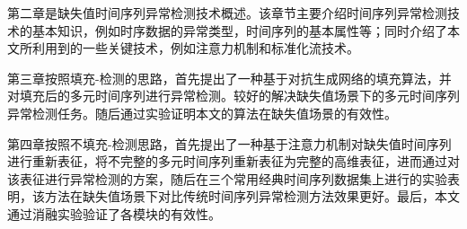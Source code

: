 第二章是缺失值时间序列异常检测技术概述。该章节主要介绍时间序列异常检测技术的基本知识，例如时序数据的异常类型，时间序列的基本属性等；同时介绍了本文所利用到的一些关键技术，例如注意力机制和标准化流技术。

第三章按照填充-检测的思路，首先提出了一种基于对抗生成网络的填充算法，并对填充后的多元时间序列进行异常检测。较好的解决缺失值场景下的多元时间序列异常检测任务。随后通过实验证明本文的算法在缺失值场景的有效性。

第四章按照不填充-检测思路，首先提出了一种基于注意力机制对缺失值时间序列进行重新表征，将不完整的多元时间序列重新表征为完整的高维表征，进而通过对该表征进行异常检测的方案，随后在三个常用经典时间序列数据集上进行的实验表明，该方法在缺失值场景下对比传统时间序列异常检测方法效果更好。最后，本文通过消融实验验证了各模块的有效性。